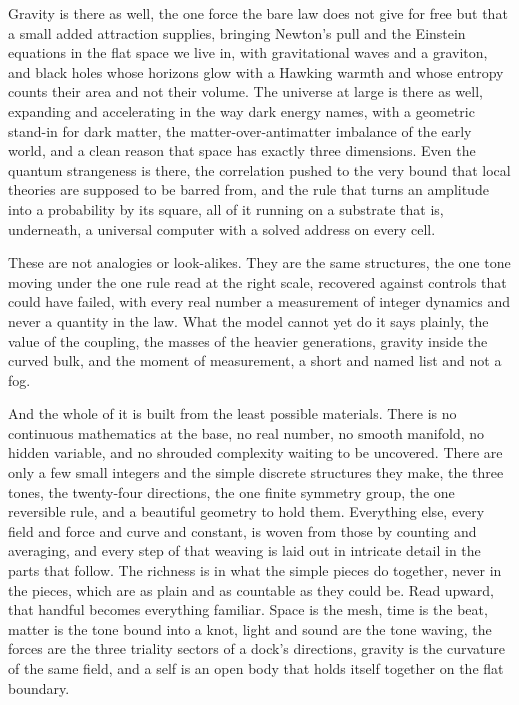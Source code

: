 Gravity is there as well, the one force the bare law does not give for free but that a small added attraction supplies, bringing Newton's pull and the Einstein equations in the flat space we live in, with gravitational waves and a graviton, and black holes whose horizons glow with a Hawking warmth and whose entropy counts their area and not their volume. The universe at large is there as well, expanding and accelerating in the way dark energy names, with a geometric stand-in for dark matter, the matter-over-antimatter imbalance of the early world, and a clean reason that space has exactly three dimensions. Even the quantum strangeness is there, the correlation pushed to the very bound that local theories are supposed to be barred from, and the rule that turns an amplitude into a probability by its square, all of it running on a substrate that is, underneath, a universal computer with a solved address on every cell.

These are not analogies or look-alikes. They are the same structures, the one tone moving under the one rule read at the right scale, recovered against controls that could have failed, with every real number a measurement of integer dynamics and never a quantity in the law. What the model cannot yet do it says plainly, the value of the coupling, the masses of the heavier generations, gravity inside the curved bulk, and the moment of measurement, a short and named list and not a fog.

And the whole of it is built from the least possible materials. There is no continuous mathematics at the base, no real number, no smooth manifold, no hidden variable, and no shrouded complexity waiting to be uncovered. There are only a few small integers and the simple discrete structures they make, the three tones, the twenty-four directions, the one finite symmetry group, the one reversible rule, and a beautiful geometry to hold them. Everything else, every field and force and curve and constant, is woven from those by counting and averaging, and every step of that weaving is laid out in intricate detail in the parts that follow. The richness is in what the simple pieces do together, never in the pieces, which are as plain and as countable as they could be. Read upward, that handful becomes everything familiar. Space is the mesh, time is the beat, matter is the tone bound into a knot, light and sound are the tone waving, the forces are the three triality sectors of a dock's directions, gravity is the curvature of the same field, and a self is an open body that holds itself together on the flat boundary.

